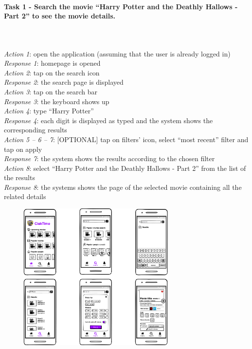 \documentclass[12pt, a4paper]{article}
\numberwithin{figure}{section}
\begin{document}
\paragraph{Task 1 - Search the movie “Harry Potter and the Deathly Hallows - Part 2” to see the movie details.}\mbox{}\\\\
\textit{Action 1}: open the application (assuming that the user is already logged in)\\
\textit{Response 1}: homepage is opened\\
\textit{Action 2}: tap on the search icon\\
\textit{Response 2}: the search page is displayed\\
\textit{Action 3}: tap on the search bar\\
\textit{Response 3}: the keyboard shows up\\
\textit{Action 4}: type “Harry Potter”\\
\textit{Response 4}: each digit is displayed as typed and the system shows the corresponding results\\
\textit{Action 5 – 6 – 7}: [OPTIONAL] tap on filters’ icon, select “most recent” filter and tap on apply\\
\textit{Response 7}: the system shows the results according to the chosen filter\\
\textit{Action 8}: select “Harry Potter and the Deathly Hallows - Part 2” from the list of the results\\
\textit{Response 8}: the systems shows the page of the selected movie containing all the related details
\begin{figure}[H]
	\centering
	\includegraphics[width=0.7\textwidth]{images/mockupSearch.png}\\
\end{figure}
\end{document}
